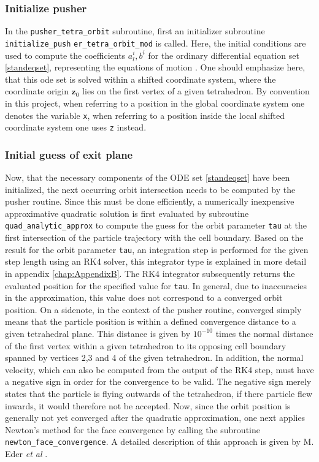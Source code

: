\documentclass[./main.tex]{subfiles}
\begin{document}
\subsubsection{Initialize pusher} 
In the \texttt{pusher\_tetra\_orbit} subroutine, first an initializer subroutine \texttt{initialize\_push}
\texttt{er\_tetra\_orbit\_mod} is called. Here, the initial conditions are used to compute the coefficients $a^i_l, b^i$ for the ordinary differential equation set \ref{standeqset}, representing the equations of motion \cite{Eder_DA}. One should emphasize here, that this ode set is solved within a shifted coordinate system, where the coordinate origin $\textbf{z}_0$ lies on the first vertex of a given tetrahedron. By convention in this project, when referring to a position in the global coordinate system one denotes the variable \texttt{x}, when referring to a position inside the local shifted coordinate system one uses \texttt{z} instead.
\subsubsection{Initial guess of exit plane}
Now, that the necessary components of the ODE set \ref{standeqset} have been initialized, the next occurring orbit intersection needs to be computed by the pusher routine. Since this must be done efficiently, a numerically inexpensive approximative quadratic solution is first evaluated by subroutine \texttt{quad\_analytic\_approx} to compute the guess for the orbit parameter \texttt{tau} at the first intersection of the particle trajectory with the cell boundary. Based on the result for the orbit parameter \texttt{tau}, an integration step is performed for the given step length using an RK4 solver, this integrator type is explained in more detail in appendix \ref{chap:AppendixB}. The RK4 integrator subsequently returns the evaluated position for the specified value for \texttt{tau}. In general, due to inaccuracies in the approximation, this value does not correspond to a converged orbit position. 
On a sidenote, in the context of the pusher routine, converged simply means that the particle position is within a defined convergence distance to a given tetrahedral plane. This distance is given by $10^{-10}$ times the normal distance of the first vertex within a given tetrahedron to its opposing cell boundary spanned by vertices 2,3 and 4 of the given tetrahedron. In addition, the normal velocity, which can also be computed from the output of the RK4 step, must have a negative sign in order for the convergence to be valid. The negative sign merely states that the particle is flying outwards of the tetrahedron, if there particle flew inwards, it would therefore not be accepted. 
Now, since the orbit position is generally not yet converged after the quadratic approximation, one next applies Newton's method for the face convergence by calling the subroutine \texttt{newton\_face\_convergence}. A detailed description of this approach is given by M. Eder \textit{et al} \cite{Eder_DA}. 
\end{document}
